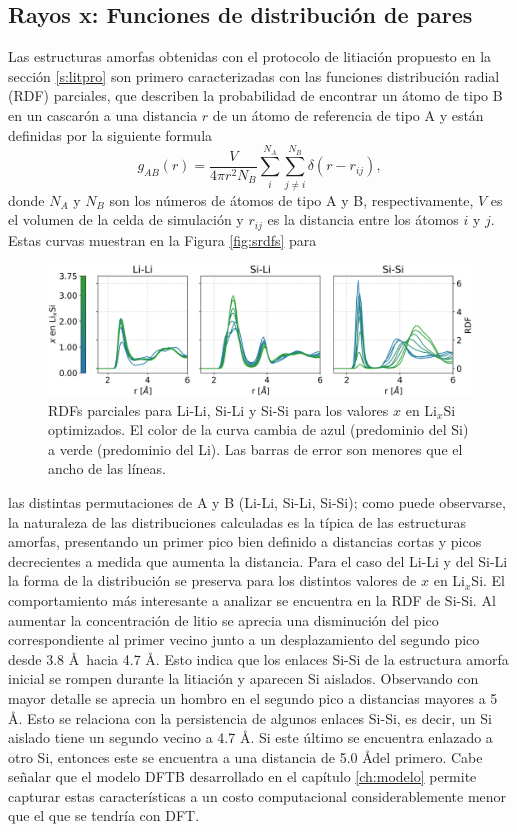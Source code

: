 \subsection{Rayos x: Funciones de distribución de pares}

Las estructuras amorfas obtenidas con el protocolo de litiación propuesto en la 
sección \ref{s:litpro} son primero caracterizadas con las funciones distribución 
radial (RDF) parciales, que describen la probabilidad de encontrar un átomo de 
tipo B en un cascarón a una distancia $r$ de un átomo de referencia de tipo A y 
están definidas por la siguiente formula
\begin{equation}
    g_{AB}(r) = \frac{V}{4 \pi r^2 N_B} \sum_{i}^{N_A} \sum_{j\neq i}^{N_B} \delta(r - r_{ij}),
\end{equation}
donde $N_A$ y $N_B$ son los números de átomos de tipo A y B, respectivamente,
$V$ es el volumen de la celda de simulación y $r_{ij}$ es la distancia entre
los átomos $i$ y $j$. Estas curvas muestran en la Figura \ref{fig:srdfs} para 
\begin{figure}[h!]
    \centering
    \includegraphics[width=\textwidth]{Silicio/prediccion/resultados/xray/prdfs.png}
    \caption{RDFs parciales para Li-Li, Si-Li y Si-Si para los valores $x$ en 
    Li$_x$Si optimizados. El color de la curva cambia de azul (predominio del Si)
    a verde (predominio del Li). Las barras de error son menores que el ancho de 
    las líneas.}
    \label{fig:prdfs}
\end{figure}
las distintas permutaciones de A y B (Li-Li, Si-Li, Si-Si); como puede observarse,
la naturaleza de las distribuciones calculadas es la típica de las estructuras
amorfas, presentando un primer pico bien definido a distancias cortas y picos 
decrecientes a medida que aumenta la distancia. Para el caso del Li-Li y del Si-Li
la forma de la distribución se preserva para los distintos valores de $x$ en 
Li$_x$Si. El comportamiento más interesante a analizar se encuentra en la RDF de 
Si-Si. Al aumentar la concentración de litio se aprecia una disminución del pico
correspondiente al primer vecino junto a un desplazamiento del segundo pico 
desde 3.8 \AA\ hacia 4.7 \AA. Esto indica que los enlaces Si-Si de la estructura 
amorfa inicial se rompen durante la litiación y aparecen Si aislados. Observando
con mayor detalle se aprecia un hombro en el segundo pico a distancias mayores 
a 5 \AA. Esto se relaciona con la persistencia de algunos enlaces Si-Si, es decir,
un Si aislado tiene un segundo vecino a 4.7 \AA. Si este último se encuentra 
enlazado a otro Si, entonces este se encuentra a una distancia de 5.0 \AA del 
primero. Cabe señalar que el modelo DFTB desarrollado en el capítulo 
\ref{ch:modelo} permite capturar estas características a un costo computacional
considerablemente menor que el que se tendría con DFT.

